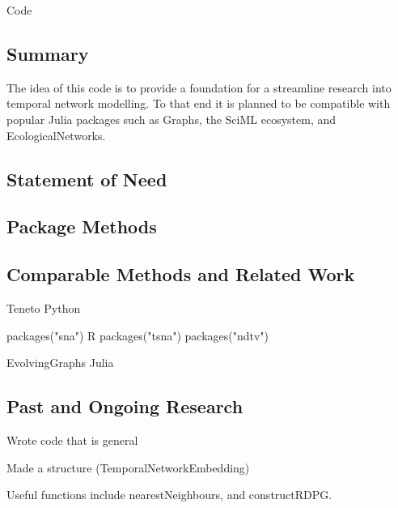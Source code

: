 \documentclass[12pt]{amsart}
\begin{document}
\begin{section}{Code}
    \subsection{Summary}
    The idea of this code is to provide a foundation for a streamline research into temporal network modelling. To that end it is planned to be compatible with popular Julia packages such as Graphs, the SciML ecosystem, and EcologicalNetworks.
    \subsection{Statement of Need}
    

    \subsection{Package Methods}

    \subsection{Comparable Methods and Related Work}
    Teneto Python

    packages("sna")  R
    packages("tsna")
    packages("ndtv")

    EvolvingGraphs Julia

    \subsection{Past and Ongoing Research}
    Wrote code that is general
    
    Made a structure (TemporalNetworkEmbedding)

    Useful functions include nearestNeighbours, and constructRDPG.
\end{section}


\printbibliography
\end{document}
